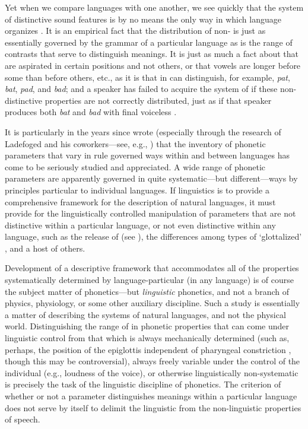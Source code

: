 Yet when we compare languages with one another, we see quickly that
the system of distinctive sound features is by no means the only way
in which language organizes . It is an empirical fact
that the distribution of non- is just as
essentially governed by the grammar of a particular language as is the
range of contrasts that serve to distinguish meanings. It is just as
much a fact about  that  are aspirated in certain
positions and not others, or that vowels are longer before some
 than before others, etc., as it is that  in 
can distinguish, for example, \emph{pat}, \emph{bat}, \emph{pad}, and
\emph{bad}; and a speaker has failed to acquire the system of 
if these non-distinctive properties are not correctly distributed, just
as if that speaker produces both \emph{bat} and \emph{bad} with final
voiceless .

It is particularly in the years since {\Bloomfield} wrote (especially
through the research of Ladefoged and his coworkers—see, e.g.,
\citealt{ladefoged80:sounds}) that the inventory of phonetic
parameters that vary in rule governed ways within and between
languages has come to be seriously studied and appreciated. A wide
range of phonetic parameters are apparently governed in quite
systematic—but different—ways by principles particular to individual
languages. If linguistics is to provide a comprehensive framework for
the description of natural languages, it must provide for the
linguistically controlled manipulation of parameters that are not
distinctive within a particular language, or not even distinctive
within any language, such as the release of  (see
\citealt{sra74:orgphon}), the differences among types of `glottalized'
, and a host of others.

Development of a descriptive framework that accommodates all of the
properties systematically determined by language-particular
 (in any language) is of course the subject matter of
phonetics—but \emph{linguistic} phonetics, and not a branch of
physics, physiology, or some other auxiliary discipline. Such a study
is essentially a matter of describing the systems of natural
languages, and not the physical world. Distinguishing the range of
 in phonetic properties that can come under linguistic
control from that which is always mechanically determined (such as,
perhaps, the position of the epiglottis independent of pharyngeal
constriction \citep{shahin11:pharyngeals}, though this may be
controversial), always freely variable under the control of the
individual (e.g., loudness of the voice), or otherwise linguistically
non-systematic is precisely the task of the linguistic discipline of
phonetics. The criterion of whether or not a parameter distinguishes
meanings within a particular language does not serve by itself to
delimit the linguistic from the non-linguistic properties of speech.

